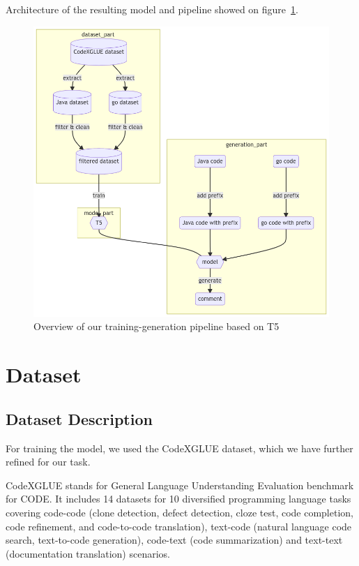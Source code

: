 \documentclass{article}
\begin{document}
Architecture of the resulting model and pipeline showed on {figure}~\ref{fig:model}.

\begin{figure}[!tbh]
    \centering
    \includegraphics[width=1.0\linewidth]{model.png}
    \caption{Overview of our training-generation pipeline based on T5}
    \label{fig:model}
\end{figure}

\section{Dataset}

\subsection{Dataset Description}

For training the model, we used the CodeXGLUE dataset, which we have further refined for our task.

CodeXGLUE \cite{codexglue} stands for General Language Understanding Evaluation benchmark for CODE. It includes 14 datasets for 10 diversified programming language tasks covering code-code (clone detection, defect detection, cloze test, code completion, code refinement, and code-to-code translation), text-code (natural language code search, text-to-code generation), code-text (code summarization) and text-text (documentation translation) scenarios.
\end{document}
